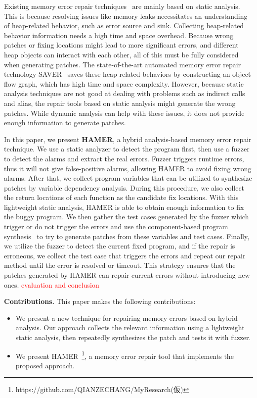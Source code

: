 \documentclass[a4paper,11pt,oneside,openany]{book}
\begin{document}
Existing memory error repair techniques~\cite{SAVER,Memfix} are mainly based on static analysis. This is because resolving issues like memory leaks necessitates an understanding of heap-related behavior, such as error source and sink. Collecting heap-related behavior information needs a high time and space overhead. Because wrong patches or fixing locations might lead to more significant errors, and different heap objects can interact with each other, all of this must be fully considered when generating patches. The state-of-the-art automated memory error repair technology SAVER~\cite{SAVER} saves these heap-related behaviors by constructing an object flow graph, which has high time and space complexity. However, because static analysis techniques are not good at dealing with problems such as indirect calls and alias, the repair tools based on static analysis might generate the wrong patches. While dynamic analysis can help with these issues, it does not provide enough information to generate patches.

In this paper, we present \textbf{HAMER}, a hybrid analysis-based memory error repair \mbox{technique}. We use a static analyzer to detect the program first, then use a fuzzer to detect the alarms and extract the real errors. Fuzzer triggers runtime errors, thus it will not give false-positive alarms, allowing HAMER to avoid fixing wrong alarms. After that, we collect program variables that can be utilized to synthesize patches by variable dependency analysis. During this procedure, we also collect the return locations of each function as the candidate fix locations. With this lightweight static analysis, HAMER is able to obtain enough information to fix the buggy program. We then gather the test cases generated by the fuzzer which trigger or do not trigger the errors and use the component-based program synthesis~\cite{oracle} to try to generate patches from these variables and test cases. Finally, we utilize the fuzzer to detect the current fixed program, and if the repair is erroneous, we collect the test case that triggers the errors and repeat our repair method until the error is resolved or timeout. This strategy ensures that the patches generated by HAMER can repair current errors without introducing new ones. \textcolor{red}{evaluation and conclusion}

\textbf{Contributions.} This paper makes the following contributions:
\begin{itemize}
  \item We present a new technique for repairing memory errors based on hybrid analysis. Our approach collects the relevant information using a lightweight static analysis, then repeatedly synthesizes the patch and tests it with fuzzer.
  \item We present HAMER~\footnote{https://github.com/QIANZECHANG/MyResearch(仮)}, a memory error repair tool that implements the proposed approach.
\end{itemize}
\end{document}
